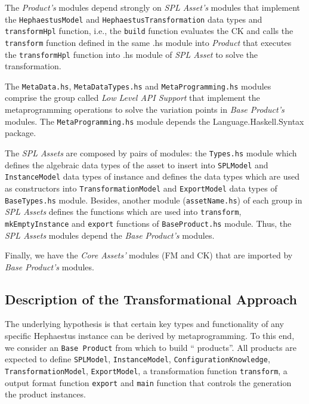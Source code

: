 The \textit{\hp{} Product's} modules depend strongly on \textit{\hp{} SPL Asset's} modules that implement the \texttt{HephaestusModel} and \texttt{HephaestusTransformation} data types and \texttt{transformHpl} function, i.e., the \texttt{build} function evaluates the CK and calls the \texttt{transform} function defined in the same \hp.hs module into \textit{\hp{} Product} that executes the \texttt{transformHpl} function into \hp.hs module of \textit{ \hp{} SPL Asset} to solve the \hpl{} transformation.

The \texttt{MetaData.hs}, \texttt{MetaDataTypes.hs} and \texttt{MetaProgramming.hs} modules comprise the group called \textit{Low Level API Support} that implement the metaprogramming operations to solve the variation points in \textit{Base Product's} modules. The \texttt{MetaProgramming.hs} module depends the Language.Haskell.Syntax package.

The \textit{SPL Assets} are composed by pairs of modules: the \texttt{Types.hs} module which defines the algebraic data types of the asset to insert into \texttt{SPLModel} and \texttt{InstanceModel} data types of \hpl{} instance and defines the data types which are used as constructors into \texttt{TransformationModel} and \texttt{ExportModel} data types of \texttt{BaseTypes.hs} module. 
Besides, another module (\texttt{assetName.hs}) of each group in \textit{SPL Assets} defines the functions which are used into \texttt{transform}, \texttt{mkEmptyInstance} and \texttt{export} functions of \texttt{BaseProduct.hs} module. Thus, the \textit{SPL Assets} modules depend the \textit{Base Product's} modules.

Finally, we have the \textit{Core Assets'} modules (FM and CK) that are imported by \textit{Base Product's} modules.



\subsection{Description of the Transformational Approach}

The underlying hypothesis is that certain key types and functionality of any specific Hephaestus instance can be derived by metaprogramming. To this end, we consider an \texttt{Base Product} from which to build ``\hpl{} products''. All products are expected to define \texttt{SPLModel}, \texttt{InstanceModel}, \texttt{ConfigurationKnowledge}, \texttt{TransformationModel}, \texttt{ExportModel}, a transformation function \texttt{transform}, a output format function \texttt{export} and \texttt{main} function that controls the generation the product instances.

